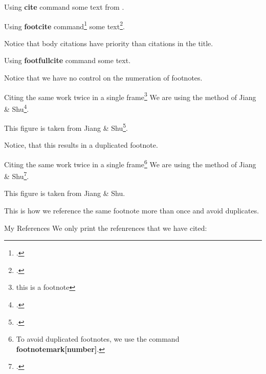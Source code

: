 \documentclass[11pt]{beamer}
\begin{document}
    \begin{frame}{Using {\bf cite} command}
        some text from \cite{KennedyGruber2008}.
    \end{frame}

    \begin{frame}{Using {\bf footcite} command\footcite{DucrosEtal2000}}%
        some text\footcite{KennedyGruber2008}.
        \vspace{10pt}

        Notice that body citations have priority than citations in the title.
    \end{frame}

    \begin{frame}{Using {\bf footfullcite} command}%
        some text.
        \vspace{10pt}

        Notice that we have no control on the numeration of footnotes.
    \end{frame}

    \begin{frame}{Citing the same work twice in a single frame\footnote[99]{this is a footnote}}
        We are using the method of Jiang \& Shu\footcite{JiangShu1996}.
        \vspace{10pt}

        This figure is taken from Jiang \& Shu\footcite{JiangShu1996}.
        \vspace{10pt}

        Notice, that this results in a duplicated footnote.
    \end{frame}

    \begin{frame}{Citing the same work twice in a single frame\footnote[100]{To avoid duplicated footnotes, we use the command {\bf footnotemark[number]}.}}
      We are using the method of Jiang \& Shu\footcite{JiangShu1996}.
      \vspace{10pt}

      This figure is taken from Jiang \& Shu\footnotemark[4].
      \vspace{10pt}

      This is how we reference the same footnote more than once and avoid duplicates.
    \end{frame}
    
    \begin{frame}{My References}
      We only print the refenrences that we have cited:
      \vspace{10pt}

      \printbibliography
    \end{frame}
\end{document}
